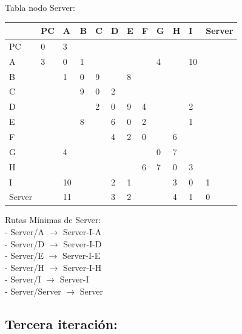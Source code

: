 \documentclass[a4paper]{article}
\begin{document}
\begin{table}[ht]
Tabla nodo Server:\\
\begin{tabular}{|l|l|l|l|l|l|l|l|l|l|l|l|}
\hline
       & PC & A  & B & C & D & E & F & G & H & I  & Server \\ \hline
PC     & 0  & 3  &   &   &   &   &   &   &   &    &        \\ \hline
A      & 3  & 0  & 1 &   &   &   &   & 4 &   & 10 &        \\ \hline
B      &    & 1  & 0 & 9 &   & 8 &   &   &   &    &        \\ \hline
C      &    &    & 9 & 0 & 2 &   &   &   &   &    &        \\ \hline
D      &    &    &   & 2 & 0 & 9 & 4 &   &   & 2  &        \\ \hline
E      &    &    & 8 &   & 6 & 0 & 2 &   &   & 1  &        \\ \hline
F      &    &    &   &   & 4 & 2 & 0 &   & 6 &    &        \\ \hline
G      &    & 4  &   &   &   &   &   & 0 & 7 &    &        \\ \hline
H      &    &    &   &   &   &   & 6 & 7 & 0 & 3  &        \\ \hline
I      &    & 10 &   &   & 2 & 1 &   &   & 3 & 0  & 1      \\ \hline
Server &    & 11 &   &   & 3 & 2 &   &   & 4 & 1  & 0      \\ \hline
\end{tabular}

Rutas Mínimas de Server:\\
-	Server/A  $\rightarrow$  Server-I-A\\
-	Server/D  $\rightarrow$  Server-I-D\\
-	Server/E  $\rightarrow$  Server-I-E\\
-	Server/H  $\rightarrow$  Server-I-H\\
-	Server/I  $\rightarrow$  Server-I\\
-	Server/Server  $\rightarrow$  Server\\
\end{table}


\clearpage

\subsection{Tercera iteración:}
\end{document}
